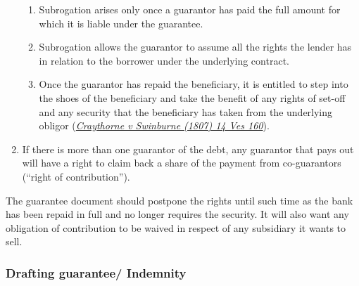 \documentclass[
]{article}
\providecommand{\tightlist}{%
  \setlength{\itemsep}{0pt}\setlength{\parskip}{0pt}}
\begin{document}
\begin{enumerate}
  \begin{enumerate}
  \tightlist
  \item
    Subrogation arises only once a guarantor has paid the full amount
    for which it is liable under the guarantee.
  \item
    Subrogation allows the guarantor to assume all the rights the lender
    has in relation to the borrower under the underlying contract.
  \item
    Once the guarantor has repaid the beneficiary, it is entitled to
    step into the shoes of the beneficiary and take the benefit of any
    rights of set-off and any security that the beneficiary has taken
    from the underlying obligor
    (\emph{\href{https://uk.westlaw.com/D-000-5042?originationContext=document\&transitionType=PLDocumentLink\&contextData=(sc.Default)\&ppcid=9fc18fbc2d79468f9bd5272f7e22e9db}{Craythorne
    v Swinburne (1807) 14 Ves 160}}).
  \end{enumerate}
\item
  If there is more than one guarantor of the debt, any guarantor that
  pays out will have a right to claim back a share of the payment from
  co-guarantors (``right of contribution'').
\end{enumerate}

The guarantee document should postpone the rights until such time as the
bank has been repaid in full and no longer requires the security. It
will also want any obligation of contribution to be waived in respect of
any subsidiary it wants to sell.

\hypertarget{drafting-guarantee-indemnity}{%
\subsubsection{Drafting guarantee/
Indemnity}\label{drafting-guarantee-indemnity}}
\end{document}
